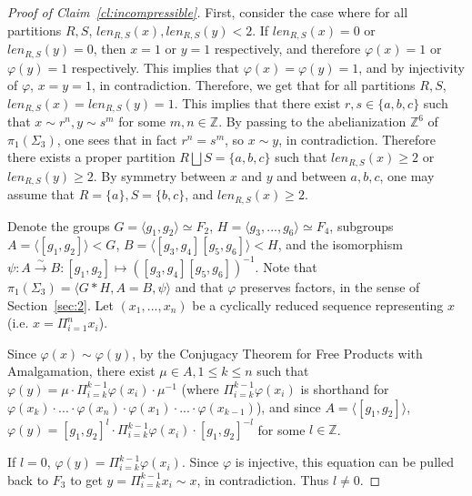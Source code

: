 \documentclass[11pt]{article}
\newcommand{\Z}{\mathbb{Z}}
\begin{document}
\begin{proof}[Proof of Claim~\ref{cl:incompressible}]
            First, consider the case where for all partitions $R,S$, $len_{R,S}(x), len_{R,S}(y) < 2$. If $len_{R,S}(x) = 0$ or $len_{R,S}(y) = 0$, then $x = 1$ or $y = 1$ respectively, and therefore $\varphi(x) = 1$ or $\varphi(y) = 1$ respectively. This implies that $\varphi(x) = \varphi(y) = 1$, and by injectivity of $\varphi$, $x = y = 1$, in contradiction. Therefore, we get that for all partitions $R,S$, $len_{R,S}(x) = len_{R,S}(y) = 1$. This implies that there exist $r, s \in \{a,b,c\}$ such that $x \sim r^n, y \sim s^m$ for some $m,n \in \Z$. By passing to the abelianization $\Z^6$ of $\pi_1(\Sigma_3)$, one sees that in fact $r^n = s^m$, so $x \sim y$, in contradiction. Therefore there exists a proper partition $R \bigsqcup S = \{a,b,c\}$ such that $len_{R,S}(x) \geq 2$ or $len_{R,S}(y) \geq 2$. By symmetry between $x$ and $y$ and between $a,b,c$, one may assume that $R = \{a\}, S = \{b,c\}$, and $len_{R,S}(x) \geq 2$.
            
            Denote the groups $G = \langle g_1,g_2 \rangle \simeq F_2$, $H = \langle g_3,...,g_6 \rangle \simeq F_4$, subgroups $A = \langle [g_1,g_2] \rangle < G$, $B = \langle [g_3,g_4][g_5,g_6] \rangle < H$, and the isomorphism $\psi: A \xrightarrow{\sim} B : [g_1,g_2] \mapsto ([g_3,g_4][g_5,g_6])^{-1}$. Note that $\pi_1(\Sigma_3) = \langle G * H, A = B, \psi \rangle$ and that $\varphi$ preserves factors, in the sense of Section~\ref{sec:2}. Let $(x_1,...,x_n)$ be a cyclically reduced sequence representing $x$ (i.e. $x = \Pi_{i=1}^n x_i$).
            
            Since $\varphi(x) \sim \varphi(y)$, by the Conjugacy Theorem for Free Products with Amalgamation, there exist $\mu \in A, 1 \leq k \leq n$ such that $\varphi(y) = \mu \cdot \Pi_{i=k}^{k-1} \varphi(x_i) \cdot \mu^{-1}$ (where $\Pi_{i=k}^{k-1} \varphi(x_i)$ is shorthand for $\varphi(x_k) \cdot ... \cdot \varphi(x_n) \cdot \varphi(x_1) \cdot ... \cdot \varphi(x_{k-1})$), and since $A = \langle [g_1,g_2] \rangle$, $\varphi(y) = [g_1,g_2]^l \cdot \Pi_{i=k}^{k-1} \varphi(x_i) \cdot [g_1,g_2]^{-l}$ for some $l \in \Z$.
            
            If $l = 0$, $\varphi(y) = \Pi_{i=k}^{k-1} \varphi(x_i)$. Since $\varphi$ is injective, this equation can be pulled back to $F_3$ to get $y = \Pi_{i=k}^{k-1} x_i \sim x$, in contradiction. Thus $l \neq 0$.
            

\end{proof}
\end{document}
